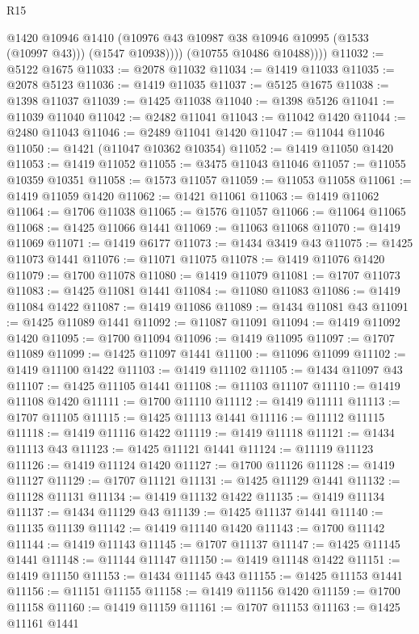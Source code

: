 \begin{lexlean}{R15}
\begin{coremodule}
                @1420
                @10946
                @1410
                (@10976 @43 @10987 @38 @10946 @10995 (@1533 (@10997 @43)))
                (@1547 @10938))))
          (@10755 @10486 @10488))))
@11032 := @5122 @1675
@11033 := @2078 @11032
@11034 := @1419 @11033
@11035 := @2078 @5123
@11036 := @1419 @11035
@11037 := @5125 @1675
@11038 := @1398 @11037
@11039 := @1425 @11038
@11040 := @1398 @5126
@11041 := @11039 @11040
@11042 := @2482 @11041
@11043 := @11042 @1420
@11044 := @2480 @11043
@11046 := @2489 @11041 @1420
@11047 := @11044 @11046
@11050 := @1421 (@11047 @10362 @10354)
@11052 := @1419 @11050 @1420
@11053 := @1419 @11052
@11055 := @3475 @11043 @11046
@11057 := @11055 @10359 @10351
@11058 := @1573 @11057
@11059 := @11053 @11058
@11061 := @1419 @11059 @1420
@11062 := @1421 @11061
@11063 := @1419 @11062
@11064 := @1706 @11038
@11065 := @1576 @11057
@11066 := @11064 @11065
@11068 := @1425 @11066 @1441
@11069 := @11063 @11068
@11070 := @1419 @11069
@11071 := @1419 @6177
@11073 := @1434 @3419 @43
@11075 := @1425 @11073 @1441
@11076 := @11071 @11075
@11078 := @1419 @11076 @1420
@11079 := @1700 @11078
@11080 := @1419 @11079
@11081 := @1707 @11073
@11083 := @1425 @11081 @1441
@11084 := @11080 @11083
@11086 := @1419 @11084 @1422
@11087 := @1419 @11086
@11089 := @1434 @11081 @43
@11091 := @1425 @11089 @1441
@11092 := @11087 @11091
@11094 := @1419 @11092 @1420
@11095 := @1700 @11094
@11096 := @1419 @11095
@11097 := @1707 @11089
@11099 := @1425 @11097 @1441
@11100 := @11096 @11099
@11102 := @1419 @11100 @1422
@11103 := @1419 @11102
@11105 := @1434 @11097 @43
@11107 := @1425 @11105 @1441
@11108 := @11103 @11107
@11110 := @1419 @11108 @1420
@11111 := @1700 @11110
@11112 := @1419 @11111
@11113 := @1707 @11105
@11115 := @1425 @11113 @1441
@11116 := @11112 @11115
@11118 := @1419 @11116 @1422
@11119 := @1419 @11118
@11121 := @1434 @11113 @43
@11123 := @1425 @11121 @1441
@11124 := @11119 @11123
@11126 := @1419 @11124 @1420
@11127 := @1700 @11126
@11128 := @1419 @11127
@11129 := @1707 @11121
@11131 := @1425 @11129 @1441
@11132 := @11128 @11131
@11134 := @1419 @11132 @1422
@11135 := @1419 @11134
@11137 := @1434 @11129 @43
@11139 := @1425 @11137 @1441
@11140 := @11135 @11139
@11142 := @1419 @11140 @1420
@11143 := @1700 @11142
@11144 := @1419 @11143
@11145 := @1707 @11137
@11147 := @1425 @11145 @1441
@11148 := @11144 @11147
@11150 := @1419 @11148 @1422
@11151 := @1419 @11150
@11153 := @1434 @11145 @43
@11155 := @1425 @11153 @1441
@11156 := @11151 @11155
@11158 := @1419 @11156 @1420
@11159 := @1700 @11158
@11160 := @1419 @11159
@11161 := @1707 @11153
@11163 := @1425 @11161 @1441

\end{coremodule}
\end{lexlean}
